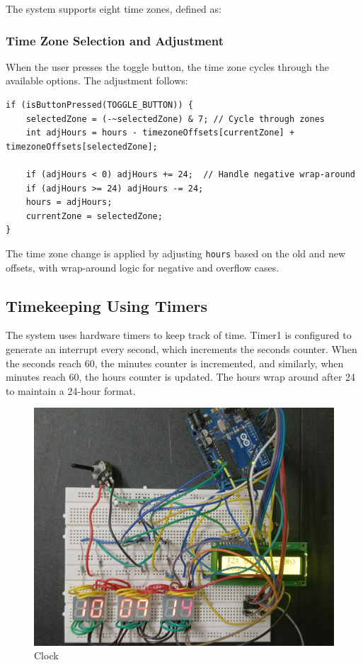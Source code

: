 \documentclass[journal]{IEEEtran}
\numberwithin{equation}{enumi}
\numberwithin{figure}{enumi}
\begin{document}
The system supports eight time zones, defined as:

\subsubsection{Time Zone Selection and Adjustment}
When the user presses the toggle button, the time zone cycles through the available options. The adjustment follows:
\begin{verbatim}
if (isButtonPressed(TOGGLE_BUTTON)) {
    selectedZone = (-~selectedZone) & 7; // Cycle through zones
    int adjHours = hours - timezoneOffsets[currentZone] + timezoneOffsets[selectedZone];

    if (adjHours < 0) adjHours += 24;  // Handle negative wrap-around
    if (adjHours >= 24) adjHours -= 24; 
    hours = adjHours;
    currentZone = selectedZone;
}
\end{verbatim}

\noindent The time zone change is applied by adjusting \texttt{hours} based on the old and new offsets, with wrap-around logic for negative and overflow cases.

\subsection{Timekeeping Using Timers}

The system uses hardware timers to keep track of time. Timer1 is configured to generate an interrupt every second, which increments the seconds counter. When the seconds reach 60, the minutes counter is incremented, and similarly, when minutes reach 60, the hours counter is updated. The hours wrap around after 24 to maintain a 24-hour format.

\begin{figure}[H]
    \centering
    \includegraphics[width=0.8\linewidth]{figs/Clock.jpeg}
    \caption{Clock}
    \label{fig:enter-label}
\end{figure}
\end{document}

